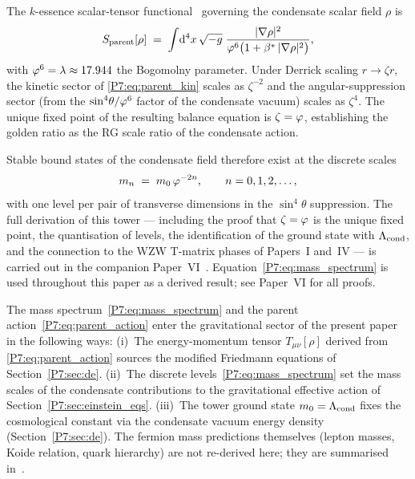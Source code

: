 \begin{remark}
\label{P7:rem:rg_tower}
The $k$-essence scalar-tensor functional~\cite{Paper1} governing the
condensate scalar field $\rho$ is
\begin{equation}
  S_{\mathrm{parent}}[\rho]
  \;=\; \int\!\mathrm{d}^4x\,\sqrt{-g}\;
  \frac{|\nabla\rho|^2}{\varphi^6\bigl(1 + \beta^{*}\,|\nabla\rho|^2\bigr)},
  \label{P7:eq:parent_kin}
\end{equation}
with $\varphi^6 = \lambda \approx 17.944$ the Bogomolny parameter.
Under Derrick scaling $r \to \zeta r$, the kinetic sector of
\eqref{P7:eq:parent_kin} scales as $\zeta^{-2}$ and the angular-suppression
sector (from the $\sin^4\!\theta/\varphi^6$ factor of the condensate vacuum)
scales as $\zeta^4$.  The unique fixed point of the resulting balance
equation is $\zeta = \varphi$, establishing the golden ratio as the
RG scale ratio of the condensate action.

Stable bound states of the condensate field therefore exist at the
discrete scales
\begin{equation}
  m_n \;=\; m_0\,\varphi^{-2n}, \qquad n = 0, 1, 2, \ldots,
  \label{P7:eq:mass_spectrum}
\end{equation}
with one level per pair of transverse dimensions in the $\sin^4\!\theta$
suppression.  The full derivation of this tower --- including the proof
that $\zeta = \varphi$ is the unique fixed point, the quantisation of levels,
the identification of the ground state with $\Lambda_{\mathrm{cond}}$, and the connection
to the WZW T-matrix phases of Papers~I and~IV --- is carried out in the
companion Paper~VI~\cite{Paper6}.
Equation~\eqref{P7:eq:mass_spectrum} is used throughout this paper as a
derived result; see Paper~VI for all proofs.
\end{remark}

\begin{remark}
\label{P7:rem:role_in_paper}
The mass spectrum~\eqref{P7:eq:mass_spectrum} and the parent
action~\eqref{P7:eq:parent_action} enter the gravitational sector of the
present paper in the following ways:
(i)~The energy-momentum tensor $T_{\mu\nu}[\rho]$ derived from
\eqref{P7:eq:parent_action} sources the modified Friedmann equations of
Section~\ref{P7:sec:de}.
(ii)~The discrete levels~\eqref{P7:eq:mass_spectrum} set the mass scales
of the condensate contributions to the gravitational effective action
of Section~\ref{P7:sec:einstein_eqs}.
(iii)~The tower ground state $m_0 = \Lambda_{\mathrm{cond}}$ fixes the cosmological
constant via the condensate vacuum energy density
(Section~\ref{P7:sec:de}).
The fermion mass predictions themselves (lepton masses, Koide relation,
quark hierarchy) are not re-derived here; they are summarised
in~\cite{Paper1,Paper4,Paper6,Koide1983}.
\end{remark}

